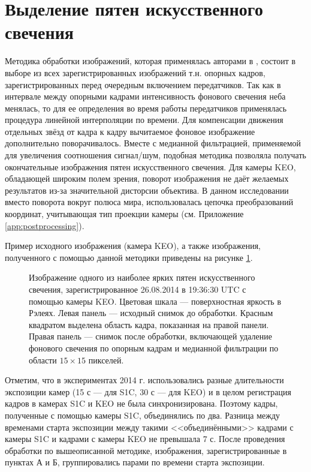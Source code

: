 \documentclass[12pt,a4paper]{article}
\begin{document}
\section{Выделение пятен искусственного свечения} \label{sec:glow}
Методика обработки изображений, которая применялась авторами в \cite{Grach2012}, состоит в выборе из всех зарегистрированных изображений т.н. опорных кадров, зарегистрированных перед очередным включением передатчиков. 
Так как в интервале между опорными кадрами интенсивность фонового свечения неба менялась, то для ее определения во время работы передатчиков применялась процедура линейной интерполяции по времени. Для компенсации движения отдельных звёзд от кадра к кадру вычитаемое фоновое изображение дополнительно поворачивалось. 
Вместе с медианной фильтрацией, применяемой для увеличения соотношения сигнал/шум, подобная методика позволяла получать окончательные изображения пятен искусственного свечения. Для камеры KEO, обладающей широким полем зрения, поворот изображения не даёт желаемых результатов из-за значительной дисторсии объектива. В данном исследовании вместо поворота вокруг полюса мира, использовалась цепочка преобразований координат, учитывающая тип проекции камеры (см. Приложение \ref{app:postprocessing}). 

Пример исходного изображения (камера KEO), а также изображения, полученного с помощью данной методики приведены на рисунке \ref{fig:fig5}.
\begin{figure}[h]
	\caption{Изображение одного из наиболее ярких пятен искусственного свечения, зарегистрированное 26.08.2014 в 19:36:30 UTC	с помощью камеры KEO. Цветовая шкала --- поверхностная яркость в Рэлеях. Левая панель --- исходный снимок до обработки. Красным квадратом выделена область кадра, показанная на правой панели. Правая панель --- снимок после обработки, включающей удаление фонового свечения по опорным кадрам и медианной фильтрации по области $15 \times 15$ пикселей.}
	\label{fig:fig5}
\end{figure}
Отметим, что в экспериментах 2014 г. использовались разные длительности экспозиции камер (15 с --- для S1C, 30 с --- для KEO) и в целом регистрация кадров в камерах S1C и KEO не была синхронизирована. Поэтому кадры, полученные с помощью камеры S1C, объединялись по два. Разница между временами старта экспозиции между такими <<объединёнными>> кадрами с камеры S1C и кадрами с камеры KEO не превышала 7 с. После проведения обработки по вышеописанной методике, изображения, зарегистрированные в пунктах А и Б, группировались парами по времени старта экспозиции.
\end{document}
